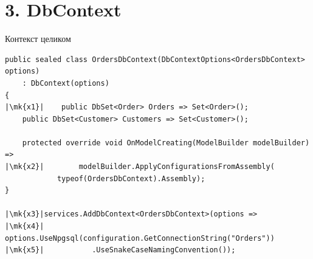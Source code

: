 \documentclass[aspectratio=169,10pt,t]{beamer}
\newcommand{\codexs}{\ttfamily\fontsize{7.0}{8.3}\selectfont}
\newcommand{\mk}[1]{\tikz[remember picture,overlay]\coordinate (#1) at (0,0.55ex);}
\begin{document}
\begin{frame}[plain]
\end{frame}

\section{3. DbContext}

\begin{frame}[plain]
\end{frame}

\begin{frame}[fragile]{Контекст целиком}
  \vspace{0.3em}
\begin{lstlisting}[style=csharp,basicstyle=\codexs,escapechar=|]
public sealed class OrdersDbContext(DbContextOptions<OrdersDbContext> options)
    : DbContext(options)
{
|\mk{x1}|    public DbSet<Order> Orders => Set<Order>();
    public DbSet<Customer> Customers => Set<Customer>();

    protected override void OnModelCreating(ModelBuilder modelBuilder) =>
|\mk{x2}|        modelBuilder.ApplyConfigurationsFromAssembly(
            typeof(OrdersDbContext).Assembly);
}

|\mk{x3}|services.AddDbContext<OrdersDbContext>(options =>
|\mk{x4}|    options.UseNpgsql(configuration.GetConnectionString("Orders"))
|\mk{x5}|           .UseSnakeCaseNamingConvention());
\end{lstlisting}

  \slidegap
\end{frame}
\end{document}
